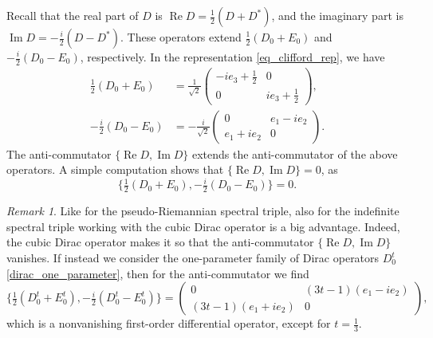 \documentclass{amsart}
\theoremstyle{definition}
\theoremstyle{remark}
\newtheorem{remark}[theorem]{Remark}
\DeclareMathOperator{\Ree}{Re}
\DeclareMathOperator{\Imm}{Im}
\numberwithin{equation}{section}
\begin{document}
Recall that the real part of $D$ is $\Ree D=\tfrac{1}{2}(D+D^*)$, and the imaginary part is $\Imm D=-\tfrac{i}{2}(D-D^*)$. These operators extend $\tfrac{1}{2}(D_0+E_0)$ and $-\tfrac{i}{2}(D_0-E_0)$, respectively. In the representation \eqref{eq_clifford_rep}, we have
\begin{equation}\label{real_and_imaginary}
    \begin{aligned}
        \tfrac{1}{2}(D_0+E_0)&=\frac{1}{\sqrt{2}}\begin{pmatrix}
            -ie_3+\tfrac{1}{2} & 0 \\
            0 & ie_3+\tfrac{1}{2}
        \end{pmatrix},\\
        -\tfrac{i}{2}(D_0-E_0)&=-\frac{i}{\sqrt{2}}\begin{pmatrix}
            0 & e_1-ie_2 \\
            e_1+ie_2 & 0
        \end{pmatrix}.
    \end{aligned}
\end{equation}
The anti-commutator $\{\Ree D,\Imm D\}$ extends the anti-commutator of the above operators. A simple computation shows that $\{\Ree D,\Imm D\}=0$, as
\begin{equation}\label{eq_anticommutator}
    \{\tfrac{1}{2}(D_0+E_0),-\tfrac{i}{2}(D_0-E_0)\}=0.
\end{equation}

\begin{remark}
    Like for the pseudo-Riemannian spectral triple, also for the indefinite spectral triple working with the cubic Dirac operator is a big advantage. Indeed, the cubic Dirac operator makes it so that the anti-commutator $\{\Ree D,\Imm D\}$ vanishes. If instead we consider the one-parameter family of Dirac operators $D_0^t$ \eqref{dirac_one_parameter}, then for the anti-commutator we find
    \begin{equation*}
        \{\tfrac{1}{2}(D_0^t+E_0^t),-\tfrac{i}{2}(D_0^t-E_0^t)\}=\begin{pmatrix}
            0 & (3t-1)(e_1-ie_2)\\
            (3t-1)(e_1+ie_2) & 0
        \end{pmatrix},
    \end{equation*}
    which is a nonvanishing first-order differential operator, except for $t=\tfrac{1}{3}$.
\end{remark}
\end{document}
